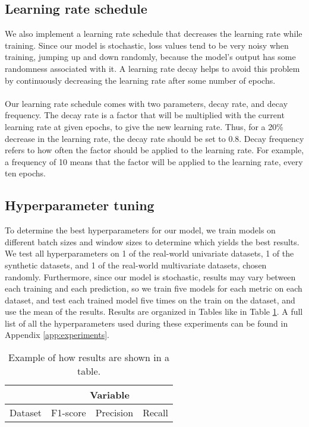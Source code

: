 \subsection{Learning rate schedule}
We also implement a learning rate schedule that decreases the learning rate while training. Since our model is stochastic, loss values tend to be very noisy when training, jumping up and down randomly, because the model's output has some randomness associated with it. A learning rate decay helps to avoid this problem by continuously decreasing the learning rate after some number of epochs.
\\\\
Our learning rate schedule comes with two parameters, decay rate, and decay frequency. The decay rate is a factor that will be multiplied with the current learning rate at given epochs, to give the new learning rate. Thus, for a 20\% decrease in the learning rate, the decay rate should be set to $0.8$. Decay frequency refers to how often the factor should be applied to the learning rate. For example, a frequency of 10 means that the factor will be applied to the learning rate, every ten epochs.

\subsection{Hyperparameter tuning}
To determine the best hyperparameters for our model, we train models on different batch sizes and window sizes to determine which yields the best results. We test all hyperparameters on 1 of the real-world univariate datasets, 1 of the synthetic datasets, and 1 of the real-world multivariate datasets, chosen randomly. Furthermore, since our model is stochastic, results may vary between each training and each prediction, so we train five models for each metric on each dataset, and test each trained model five times on the train on the dataset, and use the mean of the results. Results are organized in Tables like in Table \ref{tab:example_results}. A full list of all the hyperparameters used during these experiments can be found in Appendix \ref{app:experiments}.

\bgroup
\def\arraystretch{1.5}
\begin{table}[htbp]
\centering
\begin{tabular}{|c|c|c|c|}
\hline
        & \multicolumn{3}{c|}{Variable} \\ \hline
Dataset & F1-score & Precision & Recall \\ \hline
\end{tabular}
\caption{Example of how results are shown in a table.}
\label{tab:example_results}
\end{table}
\egroup

